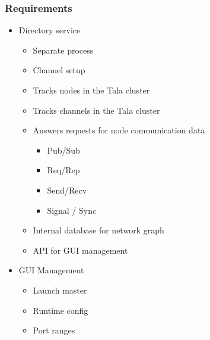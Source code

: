 \documentclass[xcolor=svgnames]{beamer}
\begin{document}
\begin{frame}[fragile]
  \frametitle{Requirements}

\begin{itemize}
\item Directory service 
\begin{itemize}
\item  Separate process
\item  Channel setup
\item  Tracks nodes in the Tala cluster
\item  Tracks channels in the Tala cluster
\item  Answers requests for node communication data
\begin{itemize}
\item Pub/Sub
\item Req/Rep
\item Send/Recv
\item Signal / Sync
\end{itemize}
\item  Internal database for network graph
\item  API for GUI management
\end{itemize}

\item GUI Management
\begin{itemize}
\item  Launch master
\item  Runtime config
\item  Port ranges
\end{itemize}

\end{itemize}
\end{frame}
\end{document}
